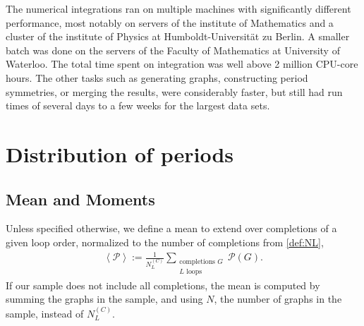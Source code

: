 \documentclass[12pt,a4paper]{article}
\newcommand{\period}{\mathcal P}
\renewcommand{\|}{\rule[-0.4ex]{0.2ex}{1.2em}}
\begin{document}
The numerical integrations ran on multiple machines with significantly different performance, most notably  on servers of the institute of Mathematics and a cluster of the institute of Physics at Humboldt-Universität zu Berlin. A smaller batch was done on the servers of the Faculty of Mathematics at University of Waterloo.  The total time spent on integration was well above 2 million CPU-core hours. The other tasks such as generating graphs, constructing period symmetries, or merging the results, were considerably faster, but still had run times of several days to a few weeks for the largest data sets.












\FloatBarrier




\section{Distribution of periods}\label{sec:distribution}






\subsection{Mean and Moments}\label{sec:moments}

Unless specified otherwise, we define a mean to extend over completions of a given loop order, normalized to the number of  completions  from \cref{def:NL}, 
\begin{align}\label{def:period_mean}
 \left \langle \period  \right \rangle  :=  \frac{1}{N^{(C)}_L}\sum_{\substack{ \text{completions }G \\ L \text{ loops} }} \period (G) . 
\end{align}
If our sample does not include all completions, the mean is computed by summing the graphs in the sample, and using $N$,  the number of graphs in the sample, instead of $N^{(C)}_L$. 
\end{document}
